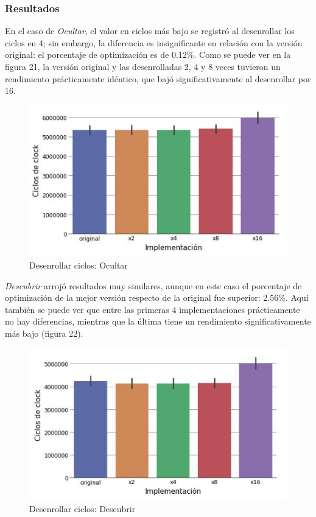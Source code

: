 \documentclass[a4paper]{article}
\begin{document}
\subsubsection{Resultados}
En el caso de \textit{Ocultar}, el valor en ciclos más bajo se registró al desenrollar los ciclos en 4; sin embargo, la diferencia es insignificante en relación con la versión original: el porcentaje de optimización es de 0.12\%. Como se puede ver en la figura 21, la versión original y las desenrolladas 2, 4 y 8 veces tuvieron un rendimiento prácticamente idéntico, que bajó significativamente al desenrollar por 16.

\begin{figure}[!htb]
  \begin{center}
	\includegraphics[scale=0.7]{img/exp1ocultar.jpg}
	\caption{Desenrollar ciclos: Ocultar}
  \end{center}
\end{figure}

\textit{Descubrir} arrojó resultados muy similares, aunque en este caso el porcentaje de optimización de la mejor versión respecto de la original fue superior: 2.56\%. Aquí también se puede ver que entre las primeras 4 implementaciones prácticamente no hay diferencias, mientras que la última tiene un rendimiento significativamente más bajo (figura 22).

\begin{figure}[!htb]
  \begin{center}
	\includegraphics[scale=0.7]{img/exp1descubrir.jpg}
	\caption{Desenrollar ciclos: Descubrir}
  \end{center}
\end{figure}
\end{document}
